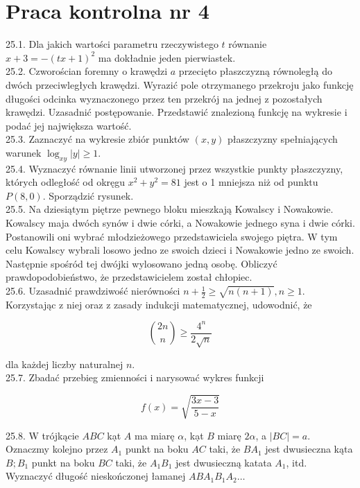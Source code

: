 \documentclass[10pt]{article}
\begin{document}
\section*{Praca kontrolna nr 4}
25.1. Dla jakich wartości parametru rzeczywistego $t$ równanie $x+3=-(t x+1)^{2}$ ma dokładnie jeden pierwiastek.\\
25.2. Czworościan foremny o krawędzi $a$ przecięto płaszczyzną równoległą do dwóch przeciwległych krawędzi. Wyrazić pole otrzymanego przekroju jako funkcję długości odcinka wyznaczonego przez ten przekrój na jednej z pozostałych krawędzi. Uzasadnić postępowanie. Przedstawić znalezioną funkcję na wykresie i podać jej największa wartość.\\
25.3. Zaznaczyć na wykresie zbiór punktów $(x, y)$ płaszczyzny spełniających warunek $\log _{x y}|y| \geq 1$.\\
25.4. Wyznaczyć równanie linii utworzonej przez wszystkie punkty płaszczyzny, których odległość od okręgu $x^{2}+y^{2}=81$ jest o 1 mniejsza niż od punktu $P(8,0)$. Sporządzić rysunek.\\
25.5. Na dziesiątym piętrze pewnego bloku mieszkają Kowalscy i Nowakowie. Kowalscy maja dwóch synów i dwie córki, a Nowakowie jednego syna i dwie córki. Postanowili oni wybrać młodzieżowego przedstawiciela swojego piętra. W tym celu Kowalscy wybrali losowo jedno ze swoich dzieci i Nowakowie jedno ze swoich. Następnie spośród tej dwójki wylosowano jedną osobę. Obliczyć prawdopodobieństwo, że przedstawicielem został chłopiec.\\
25.6. Uzasadnić prawdziwość nierówności $n+\frac{1}{2} \geq \sqrt{n(n+1)}, n \geq 1$. Korzystając z niej oraz z zasady indukcji matematycznej, udowodnić, że

$$
\binom{2 n}{n} \geq \frac{4^{n}}{2 \sqrt{n}}
$$

dla każdej liczby naturalnej $n$.\\
25.7. Zbadać przebieg zmienności i narysować wykres funkcji

$$
f(x)=\sqrt{\frac{3 x-3}{5-x}}
$$

25.8. W trójkącie $A B C$ kạt $A$ ma miarę $\alpha$, kạt $B$ miarę $2 \alpha$, a $|B C|=a$. Oznaczmy kolejno przez $A_{1}$ punkt na boku $A C$ taki, że $B A_{1}$ jest dwusieczna kąta $B ; B_{1}$ punkt na boku $B C$ taki, że $A_{1} B_{1}$ jest dwusieczną katata $A_{1}$, itd. Wyznaczyć długość nieskończonej łamanej $A B A_{1} B_{1} A_{2} \ldots$
\end{document}

